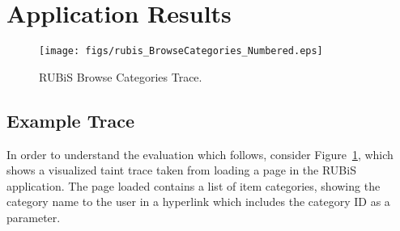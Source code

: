 \documentclass[msc,oneside]{ubcthesis}
\begin{document}


\section{Application Results}

\begin{figure}[ht]
  \begin{center}
    \texttt{[image: figs/rubis\_BrowseCategories\_Numbered.eps]}
    \caption[RUBiS Browse Categories Trace.]{\label{fig:browsecategories} RUBiS Browse Categories Trace.}
  \end{center}
\end{figure}

\subsection{Example Trace}
\label{sec:example}
In order to understand the evaluation which follows, consider Figure~\ref{fig:browsecategories}, which shows a visualized taint trace taken from loading a page in the RUBiS application. The page loaded contains a list of item categories, showing the category name to the user in a hyperlink which includes the category ID as a parameter. 
\end{document}
